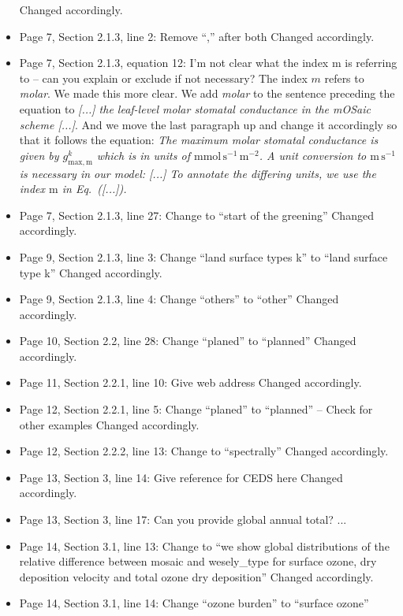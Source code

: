 \begin{itemize}
  Changed accordingly.
\item {\color{blue}Page 7, Section 2.1.3, line 2: Remove “,” after both}
  Changed accordingly.
\item {\color{blue}Page 7, Section 2.1.3, equation 12: I’m not clear what the index m is referring to – can you explain or exclude if not necessary?}
  The index $m$ refers to \emph{molar}. We made this more clear. We add \emph{molar} to the sentence preceding the equation to \emph{[...] the leaf-level molar stomatal conductance in the mOSaic scheme [...]}.
  And we move the last paragraph up and change it accordingly so that it follows the equation: \emph{The maximum molar stomatal conductance is given by $g^k_\mathrm{max, m}$ which is in units of $\mathrm{mmol\,s^{-1}\,m^{-2}}$. A unit conversion to $\mathrm{m\,s^{-1}}$ is necessary in our model: [...] To annotate the differing units, we use the index $\mathrm{m}$ in Eq.~([...]).}
\item {\color{blue}Page 7, Section 2.1.3, line 27: Change to “start of the greening”}
  Changed accordingly.
\item {\color{blue}Page 9, Section 2.1.3, line 3: Change “land surface types k” to “land surface type k” }
  Changed accordingly.
\item {\color{blue}Page 9, Section 2.1.3, line 4: Change “others” to “other”}
  Changed accordingly.
\item {\color{blue}Page 10, Section 2.2, line 28: Change “planed” to “planned”}
  Changed accordingly.
\item {\color{blue}Page 11, Section 2.2.1, line 10: Give web address}
  Changed accordingly.
\item {\color{blue}Page 12, Section 2.2.1, line 5: Change “planed” to “planned” – Check for other examples}
  Changed accordingly.
\item {\color{blue}Page 12, Section 2.2.2, line 13: Change to “spectrally”}
  Changed accordingly.
\item {\color{blue}Page 13, Section 3, line 14: Give reference for CEDS here}
  Changed accordingly.
\item {\color{blue}Page 13, Section 3, line 17: Can you provide global annual total?}
  ...
\item {\color{blue}Page 14, Section 3.1, line 13: Change to “we show global distributions of the relative difference between mosaic and wesely\_type for surface ozone, dry deposition velocity and total ozone dry deposition”}
  Changed accordingly.
\item {\color{blue}Page 14, Section 3.1, line 14: Change “ozone burden” to “surface ozone”}

\end{itemize}
